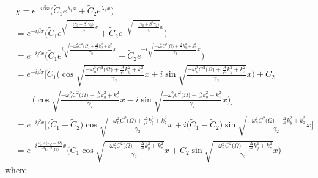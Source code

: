 \documentclass[english]{article}
\begin{document}
\begin{align*}
 & \chi=e^{-i\beta x}\biggl(\tilde{C}_{1}e^{\lambda_{1}x}+\tilde{C}_{2}e^{\lambda_{2}x}\biggr)\\
 & =e^{-i\beta x}\biggl(\tilde{C}_{1}e^{\sqrt{-\frac{\biggl(\gamma_{0}+\beta^{2}\gamma_{2}\biggr)}{\gamma_{2}}}x}+\tilde{C}_{2}e^{-\sqrt{-\frac{\biggl(\gamma_{0}+\beta^{2}\gamma_{2}\biggr)}{\gamma_{2}}}x}\biggr)\\
 & =e^{-i\beta x}\biggl(\tilde{C}_{1}e^{i\sqrt{\frac{-\omega^{2}_{n}C^{2}\biggl(\Omega\biggr)+\frac{\Delta}{r^{2}}k^{2}_{y}+k^{2}_{z}}{\gamma_{2}}}x}+\tilde{C}_{2}e^{-i\sqrt{\frac{-\omega^{2}_{n}C^{2}\biggl(\Omega\biggr)+\frac{\Delta}{r^{2}}k^{2}_{y}+k^{2}_{z}}{\gamma_{2}}}x}\biggr)\\
 & =e^{-i\beta x}\biggl[\tilde{C}_{1}\biggl(\cos\sqrt{\frac{-\omega^{2}_{n}C^{2}\biggl(\Omega\biggr)+\frac{\Delta}{r^{2}}k^{2}_{y}+k^{2}_{z}}{\gamma_{2}}}x+i\sin\sqrt{\frac{-\omega^{2}_{n}C^{2}\biggl(\Omega\biggr)+\frac{\Delta}{r^{2}}k^{2}_{y}+k^{2}_{z}}{\gamma_{2}}}x\biggr)+\tilde{C}_{2}\\
 & \qquad\biggl(\cos\sqrt{\frac{-\omega^{2}_{n}C^{2}\biggl(\Omega\biggr)+\frac{\Delta}{r^{2}}k^{2}_{y}+k^{2}_{z}}{\gamma_{2}}}x-i\sin\sqrt{\frac{-\omega^{2}_{n}C^{2}\biggl(\Omega\biggr)+\frac{\Delta}{r^{2}}k^{2}_{y}+k^{2}_{z}}{\gamma_{2}}}x\biggr)\biggr]\\
 & =e^{-i\beta x}\biggl[\biggl(\tilde{C}_{1}+\tilde{C}_{2}\biggr)\cos\sqrt{\frac{-\omega^{2}_{n}C^{2}\biggl(\Omega\biggr)+\frac{\Delta}{r^{2}}k^{2}_{y}+k^{2}_{z}}{\gamma_{2}}}x+i\biggl(\tilde{C}_{1}-\tilde{C}_{2}\biggr)\sin\sqrt{\frac{-\omega^{2}_{n}C^{2}\biggl(\Omega\biggr)+\frac{\Delta}{r^{2}}k^{2}_{y}+k^{2}_{z}}{\gamma_{2}}}x\biggr]\\
 & =e^{-i\frac{\omega_{n}A\biggl(\omega_{d}-\Omega\biggr)}{r^{3}C^{-2}\biggl(\Omega\biggr)}x}\biggl(C_{1}\cos\sqrt{\frac{-\omega^{2}_{n}C^{2}\biggl(\Omega\biggr)+\frac{\Delta}{r^{2}}k^{2}_{y}+k^{2}_{z}}{\gamma_{2}}}x+C_{2}\sin\sqrt{\frac{-\omega^{2}_{n}C^{2}\biggl(\Omega\biggr)+\frac{\Delta}{r^{2}}k^{2}_{y}+k^{2}_{z}}{\gamma_{2}}}x\biggr)
\end{align*}
 where 
\end{document}
